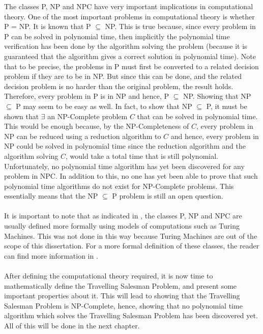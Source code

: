 \documentclass[12pt]{article}
\numberwithin{equation}{subsection}
\numberwithin{table}{subsection}
\numberwithin{algorithm}{subsection}
\begin{document}
The classes P, NP and NPC have very important implications in computational theory. One of the most important problems in computational theory is whether P = NP. It is known that P $\subseteq$ NP. This is true because, since every problem in P can be solved in polynomial time, then implicitly the polynomial time verification has been done by the algorithm solving the problem (because it is guaranteed that the algorithm gives a correct solution in polynomial time). Note that to be precise, the problems in P must first be converted to a related decision problem if they are to be in NP. But since this can be done, and the related decision problem is no harder than the original problem, the result holds. Therefore, every problem in P is in NP and hence, P $\subseteq$ NP. Showing that NP $\subseteq$ P may seem to be easy as well. In fact, to show that NP $\subseteq$ P, it must be shown that $\exists$ an NP-Complete problem $\mathit{C}$ that can be solved in polynomial time. This would be enough because, by the NP-Completeness of $\mathit{C}$, every problem in NP can be reduced using a reduction algorithm to $\mathit{C}$ and hence, every problem in NP could be solved in polynomial time since the reduction algorithm and the algorithm solving $\mathit{C}$, would take a total time that is still polynomial. Unfortunately, no polynomial time algorithm has yet been discovered for any problem in NPC. In addition to this, no one has yet been able to prove that such polynomial time algorithms do not exist for NP-Complete problems. This essentially means that the NP $\subseteq$ P problem is still an open question. \cite{cormen_leiserson_rivest_stein}\\\\
It is important to note that as indicated in \cite{dorigo_stutzle_thomas_2004}, the classes P, NP and NPC are usually defined more formally using models of computations such as Turing Machines. This was not done in this way because Turing Machines are out of the scope of this dissertation. For a more formal definition of these classes, the reader can find more information in \cite{garey_johnson_1979}.\\\\
After defining the computational theory required, it is now time to mathematically define the Travelling Salesman Problem, and present some important properties about it. This will lead to showing that the Travelling Salesman Problem is NP-Complete, hence, showing that no polynomial time algorithm which solves the Travelling Salesman Problem has been discovered yet. All of this will be done in the next chapter.
\end{document}
